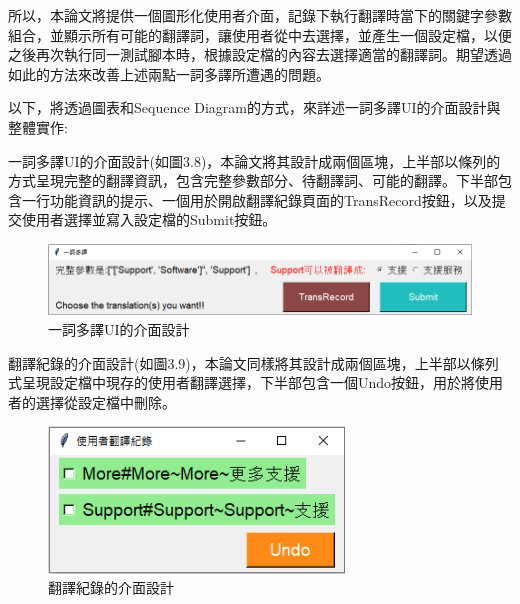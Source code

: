 所以，本論文將提供一個圖形化使用者介面，記錄下執行翻譯時當下的關鍵字參數組合，並顯示所有可能的翻譯詞，讓使用者從中去選擇，並產生一個設定檔，以便之後再次執行同一測試腳本時，根據設定檔的內容去選擇適當的翻譯詞。期望透過如此的方法來改善上述兩點一詞多譯所遭遇的問題。

以下，將透過圖表和Sequence Diagram的方式，來詳述一詞多譯UI的介面設計與整體實作:

一詞多譯UI的介面設計(如圖3.8)，本論文將其設計成兩個區塊，上半部以條列的方式呈現完整的翻譯資訊，包含完整參數部分、待翻譯詞、可能的翻譯。下半部包含一行功能資訊的提示、一個用於開啟翻譯紀錄頁面的TransRecord按鈕，以及提交使用者選擇並寫入設定檔的Submit按鈕。
\begin{figure}[H]
    \includegraphics[width= \textwidth]{../論文截圖/3-4-1一詞多譯UI介面設計.png}
    \caption{一詞多譯UI的介面設計}
\end{figure}

翻譯紀錄的介面設計(如圖3.9)，本論文同樣將其設計成兩個區塊，上半部以條列式呈現設定檔中現存的使用者翻譯選擇，下半部包含一個Undo按鈕，用於將使用者的選擇從設定檔中刪除。
\begin{figure}[H]
    \centering
    \includegraphics[width= 0.7\textwidth]{../論文截圖/3-4-2 翻譯紀錄介面設計.png}
    \caption{翻譯紀錄的介面設計}
\end{figure}


